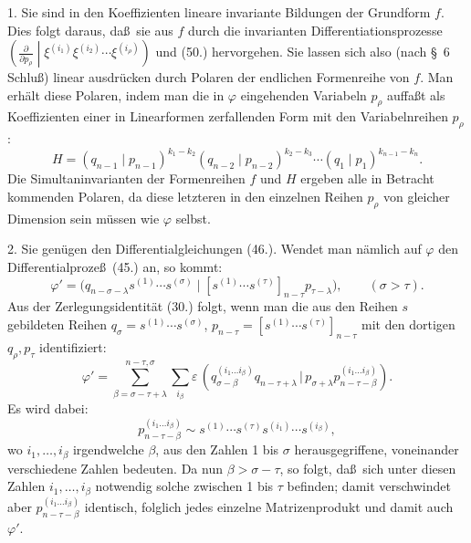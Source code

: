 \documentclass[11pt]{article}
\providecommand{\pair}[2]{(#1\,|\,#2)}
\providecommand{\eps}{\varepsilon}
\begin{document}
1. Sie sind in den Koeffizienten lineare invariante Bildungen der Grundform $f$. Dies folgt daraus, da\ss\ sie aus $f$ durch die invarianten Differentiationsprozesse $\left(\frac{\partial}{\partial p_\rho}\middle|\xi^{(i_1)}\xi^{(i_2)}\cdots\xi^{(i_\rho)}\right)$ und (50.) hervorgehen. Sie lassen sich also (nach \S\ 6 Schlu\ss) linear ausdr\"ucken durch Polaren der endlichen Formenreihe von $f$. Man erh\"alt diese Polaren, indem man die in $\varphi$ eingehenden Variabeln $p_\rho$ auffa\ss t als Koeffizienten einer in Linearformen zerfallenden Form mit den Variabelnreihen $p_\rho$:
\begin{equation}
 H=(q_{n-1}\mid p_{n-1})^{k_1-k_2}(q_{n-2}\mid p_{n-2})^{k_2-k_3}\cdots(q_1\mid p_1)^{k_{n-1}-k_n}.
\tag{52}
\end{equation}
Die Simultaninvarianten der Formenreihen $f$ und $H$ ergeben alle in Betracht kommenden Polaren, da diese letzteren in den einzelnen Reihen $p_\rho$ von gleicher Dimension sein m\"ussen wie $\varphi$ selbst.

2. Sie gen\"ugen den Differentialgleichungen (46.). Wendet man n\"amlich auf $\varphi$ den Differentialproze\ss\ (45.) an, so kommt:
\[
 \varphi'=\bigl(q_{n-\sigma-\lambda}s^{(1)}\cdots s^{(\sigma)}\mid [s^{(1)}\cdots s^{(\tau)}]_{n-\tau}p_{\tau-\lambda}\bigr),\qquad (\sigma>\tau).
\]
Aus der Zerlegungsidentit\"at (30.) folgt, wenn man die aus den Reihen $s$ gebildeten Reihen $q_\sigma=s^{(1)}\cdots s^{(\sigma)}$, $p_{n-\tau}=[s^{(1)}\cdots s^{(\tau)}]_{n-\tau}$ mit den dortigen $q_\rho,p_\tau$ identifiziert:
\[
 \varphi'=\sum_{\beta=\sigma-\tau+\lambda}^{n-\tau,\sigma}\sum_{i_\beta}\eps\,
 \pair{q_{\sigma-\beta}^{(i_1\ldots i_\beta)}q_{n-\tau+\lambda}}{p_{\sigma+\lambda}p_{n-\tau-\beta}^{(i_1\ldots i_\beta)}}.
\]
Es wird dabei:
\[
 p_{n-\tau-\beta}^{(i_1\ldots i_\beta)}\sim s^{(1)}\cdots s^{(\tau)}s^{(i_1)}\cdots s^{(i_\beta)},
\]
wo $i_1,\ldots,i_\beta$ irgendwelche $\beta$, aus den Zahlen 1 bis $\sigma$ herausgegriffene, voneinander verschiedene Zahlen bedeuten. Da nun $\beta>\sigma-\tau$, so folgt, da\ss\ sich unter diesen Zahlen $i_1,\ldots,i_\beta$ notwendig solche zwischen 1 bis $\tau$ befinden; damit verschwindet aber $p_{n-\tau-\beta}^{(i_1\ldots i_\beta)}$ identisch, folglich jedes einzelne Matrizenprodukt und damit auch $\varphi'$.
\end{document}
